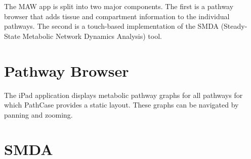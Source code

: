 The MAW app is split into two major components. The first is a pathway browser
that adds tissue and compartment information to the individual pathways. The
second is a touch-based implementation of the SMDA (Steady-State Metabolic
Network Dynamics Analysis) tool.

\section{Pathway Browser}

The iPad application displays metabolic pathway graphs for all pathways for
which PathCase provides a static layout. These graphs can be navigated by
panning and zooming.





\section{SMDA}
\label{sect:smda}







